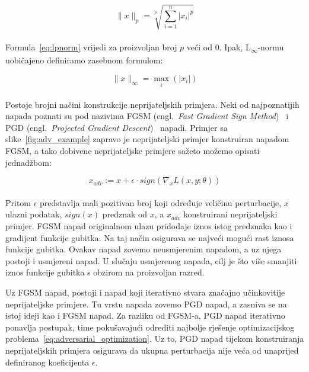 \documentclass[times, utf8, zavrsni, numeric]{fer}
\begin{document}
\begin{equation}
    \lVert x \rVert_{p} = \sqrt[p]{\sum_{i = 1}^{n}|x_{i}|^p}
    \label{eq:lpnorm}
\end{equation}
\\
Formula~\ref{eq:lpnorm} vrijedi za proizvoljan broj $p$ veći od 0. Ipak, L\textsubscript{$\infty$}-normu uobičajeno definiramo zasebnom formulom:

\begin{equation}
    \lVert x \rVert_{\infty} = \max_{i}(|x_{i}|)
    \label{eq:linfnorm}
\end{equation}
\\
Postoje brojni načini konstrukcije neprijateljskih primjera. 
Neki od najpoznatijih napada poznati su pod nazivima FGSM (engl.\ \textit{Fast Gradient Sign Method})~\cite{goodfellow2014explaining} i PGD (engl.\ \textit{Projected Gradient Descent})~\cite{madry2017towards} napadi.
Primjer sa slike~\ref{fig:adv_example} zapravo je neprijateljski primjer konstruiran napadom FGSM, a tako dobivene neprijateljske primjere sažeto možemo opisati jednadžbom:

\begin{equation}
    x_{adv} := x + \epsilon \cdot sign(\nabla_{x}L(x,y;\theta))
    \label{eq:fgsm}
\end{equation}
\\
Pritom $\epsilon$ predstavlja mali pozitivan broj koji određuje veličinu perturbacije, $x$ ulazni podatak, $sign(x)$ predznak od $x$, a $x_{adv}$ konstruirani neprijateljski primjer. 
FGSM napad originalnom ulazu pridodaje iznos istog predznaka kao i gradijent funkcije gubitka. Na taj način osigurava se najveći mogući rast iznosa funkcije gubitka. 
Ovakav napad zovemo neusmjerenim napadom, a uz njega postoji i usmjereni napad. U slučaju usmjerenog napada, cilj je što više smanjiti iznos funkcije gubitka s obzirom na proizvoljan razred.

Uz FGSM napad, postoji i napad koji iterativno stvara značajno učinkovitije neprijateljske primjere. 
Tu vrstu napada zovemo PGD napad, a zasniva se na istoj ideji kao i FGSM napad. 
Za razliku od FGSM-a, PGD napad iterativno ponavlja postupak, time pokušavajući odrediti najbolje rješenje optimizacijskog problema~\ref{eq:adversarial_optimization}.
Uz to, PGD napad tijekom konstruiranja neprijateljskih primjera osigurava da ukupna perturbacija nije veća od unaprijed definiranog koeficijenta $\epsilon$.
\end{document}
